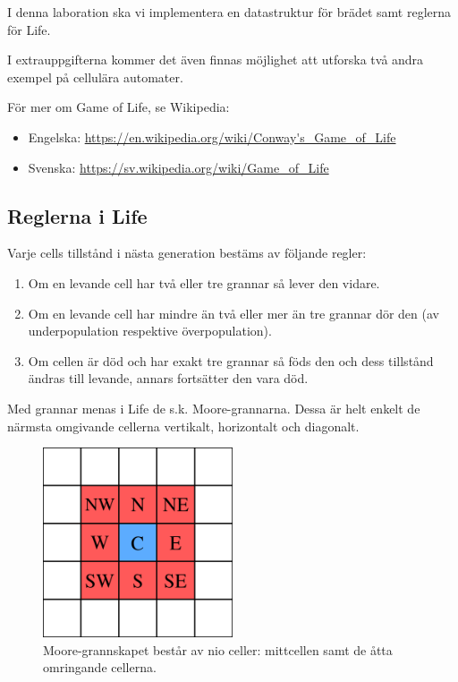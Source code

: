 \vspace{5mm}

I denna laboration ska vi implementera en datastruktur för brädet samt reglerna för Life.

I extrauppgifterna kommer det även finnas möjlighet att utforska två andra exempel på cellulära automater.

\vspace{5mm}

För mer om Game of Life, se Wikipedia:

\begin{itemize}[noitemsep,topsep=0pt]
    	\item Engelska: \url{https://en.wikipedia.org/wiki/Conway's_Game_of_Life}
    	\item Svenska: \url{https://sv.wikipedia.org/wiki/Game_of_Life}
\end{itemize}


\subsection{Reglerna i Life}
\label{subsec:life-rules}

Varje cells tillstånd i nästa generation bestäms av följande regler:
\begin{enumerate}
    \item Om en levande cell har två eller tre grannar så lever den vidare.
    \item Om en levande cell har mindre än två eller mer än tre grannar dör den (av underpopulation respektive överpopulation).
    \item Om cellen är död och har exakt tre grannar så föds den och dess tillstånd ändras till levande, annars fortsätter den vara död.
\end{enumerate}

Med grannar menas i Life de s.k. Moore-grannarna. Dessa är helt enkelt de närmsta omgivande cellerna vertikalt, horizontalt och diagonalt.

\begin{figure}[h]
  \begin{center}
    \includegraphics[width=0.5\textwidth]{../img/w12-lab/moore_neighborhood.png}
  \end{center}
  \caption{Moore-grannskapet består av nio celler: mittcellen samt de åtta omringande cellerna.\protect\footnotemark}
  \label{fig:threads:life:moore-neighborhood}
\end{figure}


